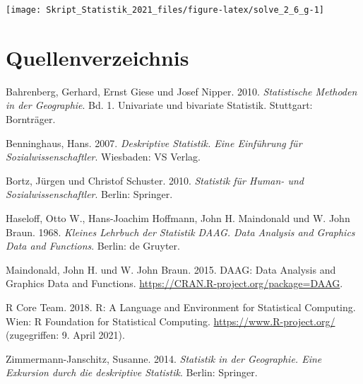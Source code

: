 \documentclass[
  11pt,
  ngerman,
  a4paper,
]{report}
\newlength{\cslhangindent}
\newenvironment{CSLReferences}[2] %
 {%
  \setlength{\parindent}{0pt}
  \ifodd #1 \everypar{\setlength{\hangindent}{\cslhangindent}}\ignorespaces\fi
  \ifnum #2 > 0
  \setlength{\parskip}{#2\baselineskip}
  \fi
 }%
 {}
\begin{document}
\begin{center}\texttt{[image: Skript\_Statistik\_2021\_files/figure-latex/solve\_2\_6\_g-1]} \end{center}

\hypertarget{quellenverzeichnis}{%
\chapter*{Quellenverzeichnis}\label{quellenverzeichnis}}

\hypertarget{refs}{}
\begin{CSLReferences}{1}{0}
\leavevmode{}%
Bahrenberg, Gerhard, Ernst Giese und Josef Nipper. 2010. \emph{Statistische Methoden in der Geographie}. Bd. 1. Univariate und bivariate Statistik. Stuttgart: Bornträger.

\leavevmode{}%
Benninghaus, Hans. 2007. \emph{Deskriptive Statistik. Eine Einführung für Sozialwissenschaftler}. Wiesbaden: VS Verlag.

\leavevmode{}%
Bortz, Jürgen und Christof Schuster. 2010. \emph{Statistik für Human- und Sozialwissenschaftler}. Berlin: Springer.

\leavevmode{}%
Haseloff, Otto W., Hans-Joachim Hoffmann, John H. Maindonald und W. John Braun. 1968. \emph{Kleines Lehrbuch der Statistik DAAG. Data Analysis and Graphics Data and Functions}. Berlin: de Gruyter.

\leavevmode{}%
Maindonald, John H. und W. John Braun. 2015. DAAG: Data Analysis and Graphics Data and Functions. \url{https://CRAN.R-project.org/package=DAAG}.

\leavevmode{}%
R Core Team. 2018. R: A Language and Environment for Statistical Computing. Wien: R Foundation for Statistical Computing. \url{https://www.R-project.org/} (zugegriffen: 9. April 2021).

\leavevmode{}%
Zimmermann-Janschitz, Susanne. 2014. \emph{Statistik in der Geographie. Eine Exkursion durch die deskriptive Statistik}. Berlin: Springer.

\end{CSLReferences}
\end{document}
